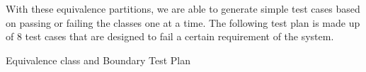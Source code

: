 \documentclass[12pt,letterpaper]{article}
\begin{document}
With these equivalence partitions, we are able to generate simple test cases based on passing or failing the classes one at a time.
The following test plan is made up of 8 test cases that are designed to fail a certain requirement of the system.
\newline

\newcommand{\specialcell}[2][c]{%
  \begin{tabular}[#1]{@{}c@{}}#2\end{tabular}}

\centering Equivalence class and Boundary Test Plan

\end{document}
